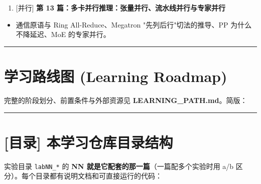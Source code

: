 \begin{enumerate}
  \item {}[并行] \textbf{\textbf{第 13 篇：多卡并行推理：张量并行、流水线并行与专家并行}}
\end{enumerate}

\begin{itemize}
  \item 通信原语与 Ring All-Reduce、Megatron "先列后行"切法的推导、PP 为什么不降延迟、MoE 的专家并行。
\end{itemize}

\vspace{0.8em}\hrule\vspace{0.8em}

\section{学习路线图 (Learning Roadmap)}

完整的阶段划分、前置条件与外部资源见 \textbf{\textbf{LEARNING\_PATH.md}}。简版：

\vspace{0.8em}\hrule\vspace{0.8em}

\section{[目录] 本学习仓库目录结构}

实验目录 \texttt{labNN\_*} 的 \textbf{NN 就是它配套的那一篇}（一篇配多个实验时用 a/b 区分）。每个目录都有说明文档和可直接运行的代码：

